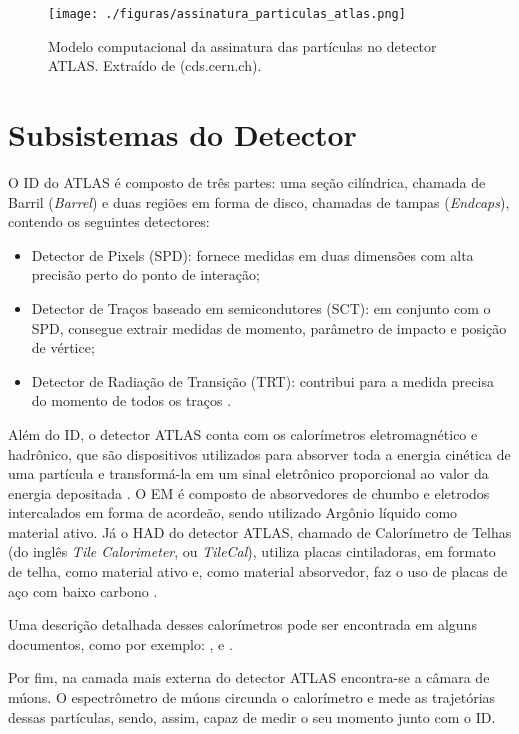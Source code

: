 \begin{figure}[h!]
	\centering
	\texttt{[image: ./figuras/assinatura\_particulas\_atlas.png]}\\
	\caption{Modelo computacional da assinatura das partículas no detector ATLAS. Extraído de (cds.cern.ch).}
	\label{fig:2T15}
\end{figure}

\section{Subsistemas do Detector}

O \ac{ID} do ATLAS é composto de três partes: uma seção cilíndrica, chamada de Barril (\emph{Barrel}) e duas regiões em forma de disco, chamadas de tampas (\emph{Endcaps}), contendo os seguintes detectores:

\begin{itemize}
	\item Detector de Pixels  (\ac{SPD}): fornece medidas em duas dimensões com alta precisão perto do ponto de interação;
	
	\item Detector de Traços baseado em semicondutores (\ac{SCT}): em conjunto com o SPD, consegue extrair medidas de momento, parâmetro de impacto e posição de vértice;
	
	\item Detector de Radiação de Transição (\ac{TRT}): contribui para a medida precisa do momento de todos os traços \cite{benekos2003atlas}.
\end{itemize}

Além do \ac{ID}, o detector ATLAS conta com os calorímetros eletromagnético e hadrônico, que são dispositivos utilizados para absorver toda a energia cinética de uma partícula e transformá-la em um sinal eletrônico proporcional ao valor da energia depositada \cite{das1994introduction}. O \ac{EM} \cite{calorimeter2008construction} é composto de absorvedores de chumbo e eletrodos intercalados em forma de acordeão, sendo utilizado Argônio líquido como material ativo. Já o \ac{HAD} do detector ATLAS, chamado de Calorímetro de Telhas (do inglês \emph{Tile Calorimeter}, ou \emph{TileCal}), utiliza placas cintiladoras, em formato de telha, como material ativo e, como material absorvedor, faz o uso de placas de aço com baixo carbono \cite{aad2010readiness}.

Uma descrição detalhada desses calorímetros pode ser encontrada em alguns documentos, como por exemplo: \cite{peralva2012detecccao}, \cite{grupen2008particle} e \cite{francavilla2012atlas}.

Por fim, na camada mais externa do detector ATLAS encontra-se a câmara de múons. O espectrômetro de múons \cite{atlas2010commissioning} circunda o calorímetro e mede as trajetórias dessas partículas, sendo, assim, capaz de medir o seu momento junto com o ID.